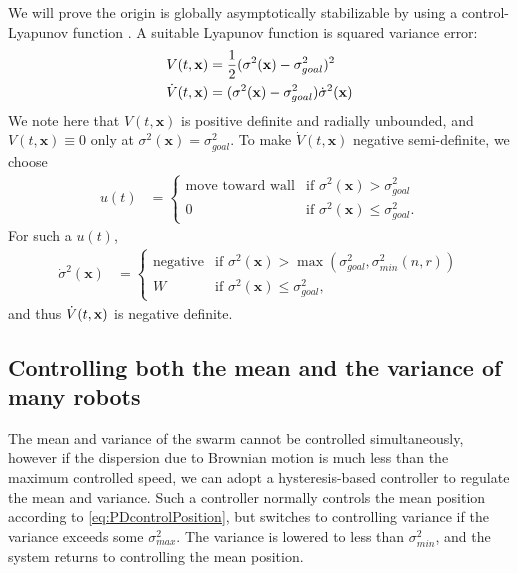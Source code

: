 We will prove the origin is globally asymptotically stabilizable by using a control-Lyapunov function \cite{Lyapunov1992}.  A suitable Lyapunov function is squared variance error:
\begin{align}
\label{eq:LyapunovVariance}
V(t,\bf{x})  &= \frac{1}{2} (\sigma^2(\mathbf{x}) - \sigma^2_{goal})^2\\
\dot{V}(t,\bf{x}) &= (\sigma^2(\mathbf{x})-\sigma^2_{goal})\dot{\sigma}^2(\mathbf{x})
\end{align}
We note here that $V(t,\mathbf{x})$ is positive definite and radially unbounded, and $V(t,\mathbf{x}) \equiv 0$ only at $\sigma^2(\mathbf{x}) = \sigma^2_{goal}$.
To make $\dot{V}(t,\mathbf{x})$ negative semi-definite, we choose
\begin{align}
u(t) &=   \begin{cases}
	 \mbox{move toward wall} &\mbox{if } \sigma^2(\mathbf{x})>\sigma^2_{goal} \\ 
	 0 & \mbox{if } \sigma^2(\mathbf{x}) \le \sigma^2_{goal}.
\end{cases} 
\end{align}
 For such a $u(t)$,
 \begin{align}
\dot{\sigma}^2(\mathbf{x}) &=   \begin{cases}
	 \mbox{negative} &\mbox{if } \sigma^2(\mathbf{x})> \max(\sigma^2_{goal}, \sigma^2_{min}(n,r))  \\ 
	 W & \mbox{if } \sigma^2(\mathbf{x}) \le \sigma^2_{goal},
\end{cases} 
\end{align} and thus
$\dot{V}(t,{\bf x})$ is negative definite.





\subsection{Controlling both the mean and the variance of many robots}

The mean and variance of the swarm cannot be controlled simultaneously, however if the dispersion due to Brownian motion is much less than the maximum controlled speed, we can adopt a hysteresis-based controller to regulate the mean and variance.  Such a controller normally controls the mean position according to \eqref{eq:PDcontrolPosition}, but switches to controlling variance if the variance exceeds some $\sigma_{max}^2$.  The variance is lowered to less than $\sigma_{min}^2$, and the system returns to controlling the mean position.


